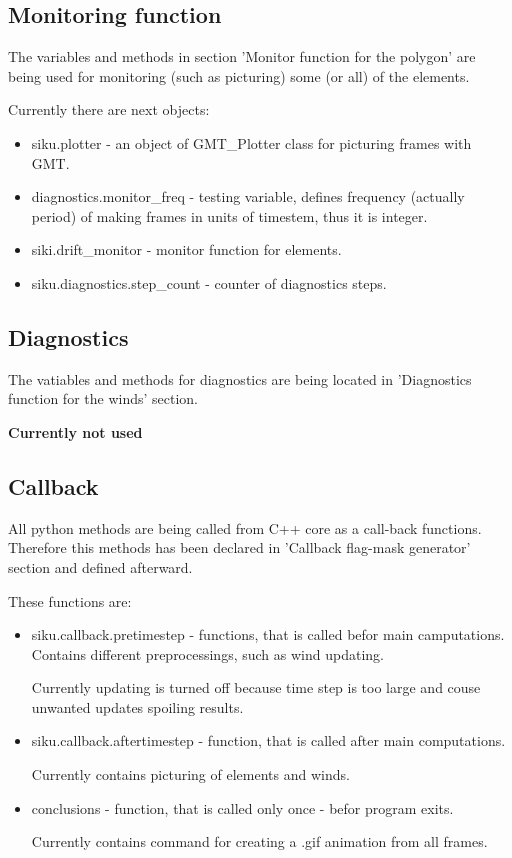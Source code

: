 \subsection{Monitoring function}

The variables and methods in section 'Monitor function for the polygon'
are being used for monitoring (such as picturing) some (or all) of the 
elements. 

Currently there are next objects:
\begin{itemize}
 \item siku.plotter - an object of GMT\_Plotter class for picturing frames
 with GMT.
 \item diagnostics.monitor\_freq - testing variable, defines frequency
 (actually period) of making frames in units of timestem, thus it is integer.
 \item siki.drift\_monitor - monitor function for elements.
 \item siku.diagnostics.step\_count - counter of diagnostics steps.
\end{itemize}

\subsection{Diagnostics}

The vatiables and methods for diagnostics are being located in 'Diagnostics 
function for the winds' section.

\textbf{Currently not used}

\subsection{Callback}

All python methods are being called from C++ core as a call-back functions.
Therefore this methods has been declared in 'Callback flag-mask generator'
section and defined afterward.

These functions are:
\begin{itemize}
 \item siku.callback.pretimestep - functions, that is called befor main 
 camputations. Contains different preprocessings, such as wind updating.
 
 Currently updating is turned off because time step is too large and couse 
 unwanted updates spoiling results.
 \item siku.callback.aftertimestep - function, that is called after main
 computations. 
 
 Currently contains picturing of elements and winds.
 \item conclusions - function, that is called only once - befor program 
 exits. 
 
 Currently contains command for creating a .gif animation from all frames.
\end{itemize}

